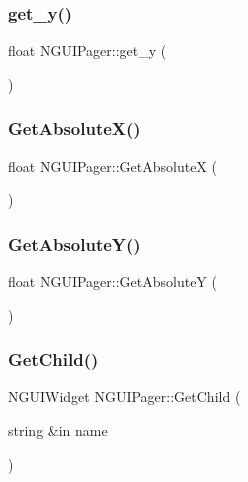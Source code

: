 \hypertarget{class_n_g_u_i_pager_a477213e9b2fdfd21b40a0cd82404b1eb}{}\label{class_n_g_u_i_pager_a477213e9b2fdfd21b40a0cd82404b1eb} 
\subsubsection{\texorpdfstring{get\+\_\+y()}{get\_y()}}
{\footnotesize\ttfamily float N\+G\+U\+I\+Pager\+::get\+\_\+y (\begin{DoxyParamCaption}{ }\end{DoxyParamCaption})}

\hypertarget{class_n_g_u_i_pager_a1924a3bd97dc92dda3925f5d82bc90c8}{}\label{class_n_g_u_i_pager_a1924a3bd97dc92dda3925f5d82bc90c8} 
\subsubsection{\texorpdfstring{Get\+Absolute\+X()}{GetAbsoluteX()}}
{\footnotesize\ttfamily float N\+G\+U\+I\+Pager\+::\+Get\+AbsoluteX (\begin{DoxyParamCaption}{ }\end{DoxyParamCaption})}

\hypertarget{class_n_g_u_i_pager_aa6310a1aca1df60f6099d73803d15fd4}{}\label{class_n_g_u_i_pager_aa6310a1aca1df60f6099d73803d15fd4} 
\subsubsection{\texorpdfstring{Get\+Absolute\+Y()}{GetAbsoluteY()}}
{\footnotesize\ttfamily float N\+G\+U\+I\+Pager\+::\+Get\+AbsoluteY (\begin{DoxyParamCaption}{ }\end{DoxyParamCaption})}

\hypertarget{class_n_g_u_i_pager_a67178e57e17c986770a5058407cfe3ae}{}\label{class_n_g_u_i_pager_a67178e57e17c986770a5058407cfe3ae} 
\subsubsection{\texorpdfstring{Get\+Child()}{GetChild()}\hspace{0.1cm}{\footnotesize\ttfamily [1/2]}}
{\footnotesize\ttfamily N\+G\+U\+I\+Widget N\+G\+U\+I\+Pager\+::\+Get\+Child (\begin{DoxyParamCaption}\item[{string \&in}]{name }\end{DoxyParamCaption})}

